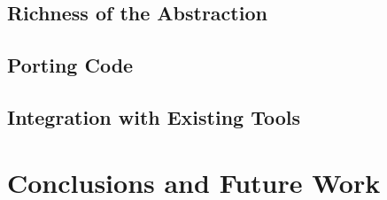 \blindtext

\subsection{Richness of the Abstraction}
\subsection{Porting Code}
\subsection{Integration with Existing Tools}

\section{Conclusions and Future Work}
\label{sec:dejafu-conclusions}

\blindtext
